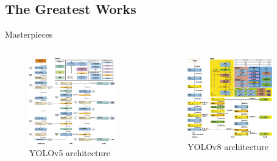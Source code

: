 \subsection{The Greatest Works}
\begin{frame}{Masterpieces}
	\begin{columns}
		\begin{column}{0.5\textwidth}
			\begin{figure}[h]
				\centering
				\includegraphics[width=0.88\textwidth]{images/yolov5_architecture.png}
				\caption{YOLOv5 architecture}
				\label{fig:yolov5}
			\end{figure}
		\end{column}
		\begin{column}{0.5\textwidth}
			\begin{figure}[h]
				\centering
				\includegraphics[width=0.85\textwidth]{images/yolov8_architecture.png}
				\caption{YOLOv8 architecture}
				\label{fig:yolov8}
			\end{figure}
		\end{column}
	\end{columns}
\end{frame}

